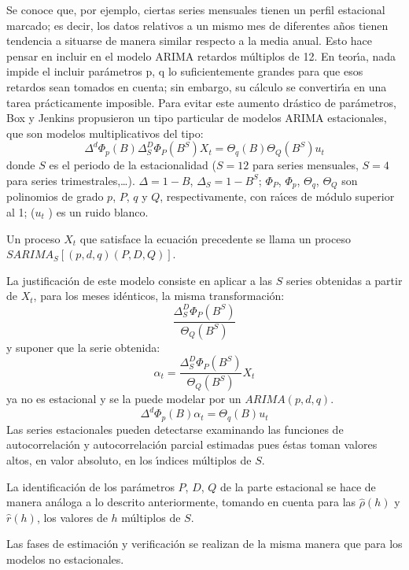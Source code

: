 Se conoce que, por ejemplo, ciertas series mensuales tienen un perfil 
estacional marcado; es decir, los datos relativos a un mismo mes de 
diferentes a\~{n}os tienen tendencia a situarse de manera similar respecto a 
la media anual. Esto hace pensar en incluir en el modelo ARIMA retardos 
m\'{u}ltiplos de 12. En teor\'{\i}a, nada impide el incluir par\'{a}metros 
p, q lo suficientemente grandes para que esos retardos sean tomados en 
cuenta; sin embargo, su c\'{a}lculo se convertir\'{\i}a en una tarea 
pr\'{a}cticamente imposible. Para evitar este aumento dr\'{a}stico de 
par\'{a}metros, Box y Jenkins propusieron un tipo particular de modelos 
ARIMA estacionales, que son modelos multiplicativos del tipo:
\[
\Delta^{d}\Phi_{p} (B)\Delta_{S}^{D} \Phi_{P} (B^{S})X_{t} =\Theta_{q} 
(B)\Theta_{Q} (B^{S})u_{t} 
\]
donde $S$ es el periodo de la estacionalidad ($S=12$ para series mensuales, $S=4$ para series 
trimestrales,\dots). $\Delta =1-B$, $\Delta_{S} =1-B^{S}$; $\Phi 
_{P}$, $\Phi_{p}$, $\Theta_{q}$, $\Theta_{Q}$ son polinomios de grado $p$, $P$, 
$q$ y $Q$, respectivamente, con ra\'{\i}ces de m\'{o}dulo superior al 1; 
($u_{t}$ ) es un ruido blanco.

Un proceso $X_{t}$ que satisface la ecuaci\'{o}n precedente se 
llama un proceso 
$SARIMA_S[(p, d, q) (P, D, Q)]$.

La justificaci\'{o}n de este modelo consiste en aplicar a las $S$ series 
obtenidas a partir de $X_{t}$, para los meses id\'{e}nticos, la 
misma transformaci\'{o}n:
\[
\frac{\Delta_{S}^{D} \Phi_{P} (B^{S})}{\Theta_{Q} (B^{S})}
\]
y suponer que la serie obtenida:
\[
\alpha_{t} =\frac{\Delta_{S}^{D} \Phi_{P} (B^{S})}{\Theta_{Q} 
(B^{S})}X_{t} 
\]
ya no es estacional y se la puede modelar por un $ARIMA (p, d, q)$.
\[
\Delta^{d}\Phi_{p} (B)\alpha_{t} =\Theta_{q} (B)u_{t} 
\]
Las series estacionales pueden detectarse examinando las funciones de 
autocorrelaci\'{o}n y autocorrelaci\'{o}n parcial estimadas pues \'{e}stas 
toman valores altos, en valor absoluto, en los \'{\i}ndices m\'{u}ltiplos de 
$S$.

La identificaci\'{o}n de los par\'{a}metros $P$, $D$, $Q$ de la parte estacional 
se hace de manera an\'{a}loga a lo descrito anteriormente, tomando en cuenta 
para las $\widehat{\rho}(h)$ y $\widehat{r}(h)$, los valores de $h$ m\'{u}ltiplos de $S$.

Las fases de estimaci\'{o}n y verificaci\'{o}n se realizan de la misma 
manera que para los modelos no estacionales.

